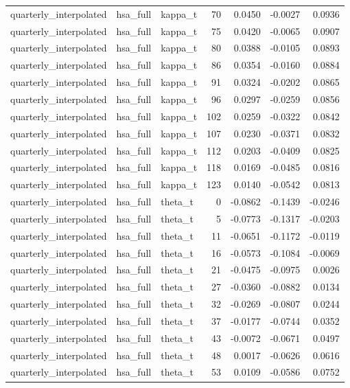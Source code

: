 \begin{tabular}{lllrrrr}
quarterly\_interpolated & hsa\_full & kappa\_t & 70 & 0.0450 & -0.0027 & 0.0936 \\
quarterly\_interpolated & hsa\_full & kappa\_t & 75 & 0.0420 & -0.0065 & 0.0907 \\
quarterly\_interpolated & hsa\_full & kappa\_t & 80 & 0.0388 & -0.0105 & 0.0893 \\
quarterly\_interpolated & hsa\_full & kappa\_t & 86 & 0.0354 & -0.0160 & 0.0884 \\
quarterly\_interpolated & hsa\_full & kappa\_t & 91 & 0.0324 & -0.0202 & 0.0865 \\
quarterly\_interpolated & hsa\_full & kappa\_t & 96 & 0.0297 & -0.0259 & 0.0856 \\
quarterly\_interpolated & hsa\_full & kappa\_t & 102 & 0.0259 & -0.0322 & 0.0842 \\
quarterly\_interpolated & hsa\_full & kappa\_t & 107 & 0.0230 & -0.0371 & 0.0832 \\
quarterly\_interpolated & hsa\_full & kappa\_t & 112 & 0.0203 & -0.0409 & 0.0825 \\
quarterly\_interpolated & hsa\_full & kappa\_t & 118 & 0.0169 & -0.0485 & 0.0816 \\
quarterly\_interpolated & hsa\_full & kappa\_t & 123 & 0.0140 & -0.0542 & 0.0813 \\
quarterly\_interpolated & hsa\_full & theta\_t & 0 & -0.0862 & -0.1439 & -0.0246 \\
quarterly\_interpolated & hsa\_full & theta\_t & 5 & -0.0773 & -0.1317 & -0.0203 \\
quarterly\_interpolated & hsa\_full & theta\_t & 11 & -0.0651 & -0.1172 & -0.0119 \\
quarterly\_interpolated & hsa\_full & theta\_t & 16 & -0.0573 & -0.1084 & -0.0069 \\
quarterly\_interpolated & hsa\_full & theta\_t & 21 & -0.0475 & -0.0975 & 0.0026 \\
quarterly\_interpolated & hsa\_full & theta\_t & 27 & -0.0360 & -0.0882 & 0.0134 \\
quarterly\_interpolated & hsa\_full & theta\_t & 32 & -0.0269 & -0.0807 & 0.0244 \\
quarterly\_interpolated & hsa\_full & theta\_t & 37 & -0.0177 & -0.0744 & 0.0352 \\
quarterly\_interpolated & hsa\_full & theta\_t & 43 & -0.0072 & -0.0671 & 0.0497 \\
quarterly\_interpolated & hsa\_full & theta\_t & 48 & 0.0017 & -0.0626 & 0.0616 \\
quarterly\_interpolated & hsa\_full & theta\_t & 53 & 0.0109 & -0.0586 & 0.0752 \\

\end{tabular}
